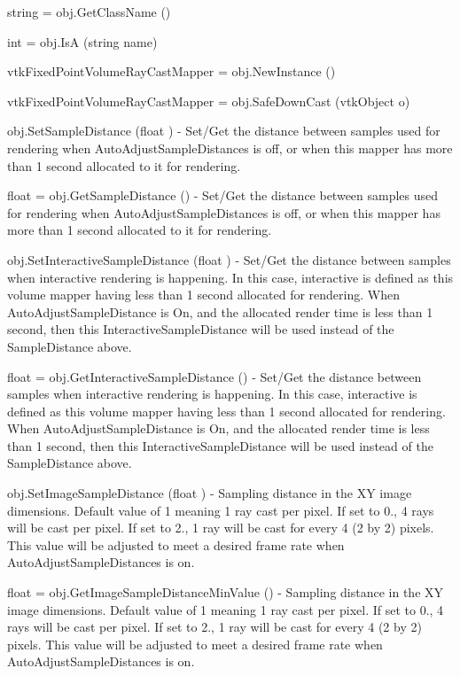 \begin{DoxyItemize}
\item {\ttfamily string = obj.\-Get\-Class\-Name ()}  
\item {\ttfamily int = obj.\-Is\-A (string name)}  
\item {\ttfamily vtk\-Fixed\-Point\-Volume\-Ray\-Cast\-Mapper = obj.\-New\-Instance ()}  
\item {\ttfamily vtk\-Fixed\-Point\-Volume\-Ray\-Cast\-Mapper = obj.\-Safe\-Down\-Cast (vtk\-Object o)}  
\item {\ttfamily obj.\-Set\-Sample\-Distance (float )} -\/ Set/\-Get the distance between samples used for rendering when Auto\-Adjust\-Sample\-Distances is off, or when this mapper has more than 1 second allocated to it for rendering.  
\item {\ttfamily float = obj.\-Get\-Sample\-Distance ()} -\/ Set/\-Get the distance between samples used for rendering when Auto\-Adjust\-Sample\-Distances is off, or when this mapper has more than 1 second allocated to it for rendering.  
\item {\ttfamily obj.\-Set\-Interactive\-Sample\-Distance (float )} -\/ Set/\-Get the distance between samples when interactive rendering is happening. In this case, interactive is defined as this volume mapper having less than 1 second allocated for rendering. When Auto\-Adjust\-Sample\-Distance is On, and the allocated render time is less than 1 second, then this Interactive\-Sample\-Distance will be used instead of the Sample\-Distance above.  
\item {\ttfamily float = obj.\-Get\-Interactive\-Sample\-Distance ()} -\/ Set/\-Get the distance between samples when interactive rendering is happening. In this case, interactive is defined as this volume mapper having less than 1 second allocated for rendering. When Auto\-Adjust\-Sample\-Distance is On, and the allocated render time is less than 1 second, then this Interactive\-Sample\-Distance will be used instead of the Sample\-Distance above.  
\item {\ttfamily obj.\-Set\-Image\-Sample\-Distance (float )} -\/ Sampling distance in the X\-Y image dimensions. Default value of 1 meaning 1 ray cast per pixel. If set to 0., 4 rays will be cast per pixel. If set to 2., 1 ray will be cast for every 4 (2 by 2) pixels. This value will be adjusted to meet a desired frame rate when Auto\-Adjust\-Sample\-Distances is on.  
\item {\ttfamily float = obj.\-Get\-Image\-Sample\-Distance\-Min\-Value ()} -\/ Sampling distance in the X\-Y image dimensions. Default value of 1 meaning 1 ray cast per pixel. If set to 0., 4 rays will be cast per pixel. If set to 2., 1 ray will be cast for every 4 (2 by 2) pixels. This value will be adjusted to meet a desired frame rate when Auto\-Adjust\-Sample\-Distances is on.  

\end{DoxyItemize}
